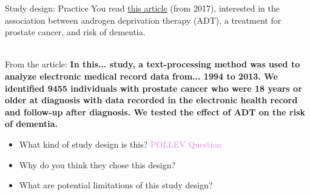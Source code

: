 \documentclass[10pt,t]{beamer}
\begin{document}
\begin{frame}{Study design: Practice}
You read \href{https://jamanetwork.com/journals/jamaoncology/fullarticle/2569059?resultClick=24}{\color{cyan} this article} (from 2017), interested in the association between androgen deprivation therapy (ADT), a treatment for prostate cancer, and risk of dementia. \\~\

From the article: \textbf{In this... study, a text-processing method was used to analyze electronic medical record data from... 1994 to 2013. We identified 9455 individuals with prostate cancer who were 18 years or older at diagnosis with data recorded in the electronic health record and follow-up after diagnosis. We tested the effect of ADT on the risk of dementia.}

\vspace{0.3cm}

\begin{itemize}
	\item What kind of study design is this? \textcolor{violet}{POLLEV Question}
	\item Why do you think they chose this design? %
	\item What are potential limitations of this study design?
\end{itemize}


\end{frame}
\end{document}
